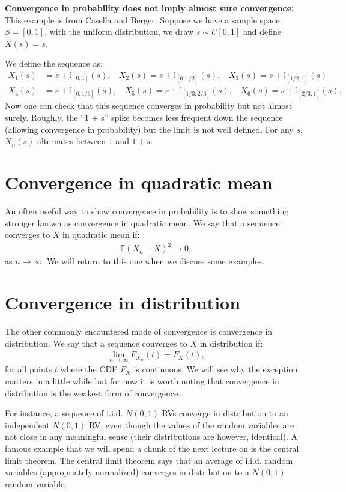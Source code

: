\documentclass[twoside,12pt]{article}
\begin{document}
{\bf Convergence in probability does not imply almost sure convergence: } This example is from Casella and Berger. Suppose we have a sample space $S = [0,1]$, with the uniform distribution, we draw $s \sim U[0,1]$ and define $X(s) = s$.

We define the sequence as:
\begin{align*}
X_1(s) &= s + \mathbb{I}_{[0,1]}(s),~~~~X_2(s) = s + \mathbb{I}_{[0,1/2]}(s),~~~~X_3(s) = s + \mathbb{I}_{[1/2,1]}(s) \\
X_4(s) &= s + \mathbb{I}_{[0,1/3]}(s),~~~~X_5(s) = s + \mathbb{I}_{[1/3,2/3]}(s),~~~~X_6(s) = s + \mathbb{I}_{[2/3,1]}(s).
\end{align*}
Now one can check that this sequence converges in probability but not almost surely. Roughly, the ``1 + s'' spike becomes less frequent down the sequence (allowing convergence in probability) but the limit is not well defined. For any $s$, $X_n(s)$ alternates between $1$ and $1 + s$.

\section{Convergence in quadratic mean}
An often useful way to show convergence in probability is to show something stronger known as convergence in quadratic mean. We say that a sequence converges to $X$ in quadratic mean if:
\begin{align*}
\mathbb{E}(X_n - X)^2 \rightarrow 0,
\end{align*}
as $n \rightarrow \infty$. We will return to this one when we discuss some examples.

\section{Convergence in distribution}
The other commonly encountered mode of convergence is convergence in distribution. We say that a sequence converges to $X$ in distribution if:
\begin{align*}
\lim_{n \rightarrow \infty} F_{X_n}(t) = F_X(t),
\end{align*}
for all points $t$ where the CDF $F_X$ is continuous. We will see why the exception matters in a little while but for now it is worth noting that convergence in distribution is the weakest form of convergence. 

For instance, a sequence of i.i.d. $N(0,1)$ RVs converge in distribution to an independent $N(0,1)$ RV, even though the values of the random variables are not close in any meaningful sense (their distributions are however,  identical). A famous example
that we will spend a chunk of the next lecture on is the central limit theorem. The central limit theorem says that an average of i.i.d. random variables (appropriately normalized) converges in distribution to a $N(0,1)$ random variable.
\end{document}
